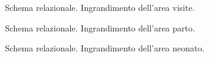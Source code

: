\begin{figure}
    \centering
    
    \caption{Schema relazionale. Ingrandimento dell'area visite.}
\label{visitsreldiagram}
\end{figure}

\begin{figure}
    \centering
    
    \caption{Schema relazionale. Ingrandimento dell'area parto.}
\label{deliveryreldiagram}
\end{figure}

\begin{figure}
    \centering
    
    \caption{Schema relazionale. Ingrandimento dell'area neonato.}
\label{newbornreldiagram}
\end{figure}
